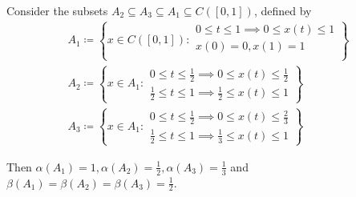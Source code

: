 \begin{example}\label{ex:noncompactness_measures}\cite[exercise 7.3]{Deimling1985}
  Consider the subsets $A_2 \subseteq A_3 \subseteq A_1 \subseteq C([0, 1])$, defined by
  \begin{align*}
    A_1 \coloneqq \left\{
      x \in C([0, 1]) \colon \begin{aligned}
        0 \leq t \leq 1 \implies 0 \leq x(t) \leq 1 \\
        x(0) = 0, x(1) = 1 \\
      \end{aligned}
    \right\}
    \\
    A_2 \coloneqq \left\{
      x \in A_1 \colon \begin{aligned}
        0 \leq t \leq \frac 1 2 \implies 0 \leq x(t) \leq \frac 1 2 \\
        \frac 1 2 \leq t \leq 1 \implies \frac 1 2 \leq x(t) \leq 1
      \end{aligned}
    \right\}
    \\
    A_3 \coloneqq \left\{
      x \in A_1 \colon \begin{aligned}
        0 \leq t \leq \frac 1 2 \implies 0 \leq x(t) \leq \frac 2 3 \\
        \frac 1 2 \leq t \leq 1 \implies \frac 1 3 \leq x(t) \leq 1
      \end{aligned}
    \right\}
  \end{align*}

  Then $\alpha(A_1) = 1, \alpha(A_2) = \frac 1 2, \alpha(A_3) = \frac 1 3$ and $\beta(A_1) = \beta(A_2) = \beta(A_3) = \frac 1 2$.
\end{example}

